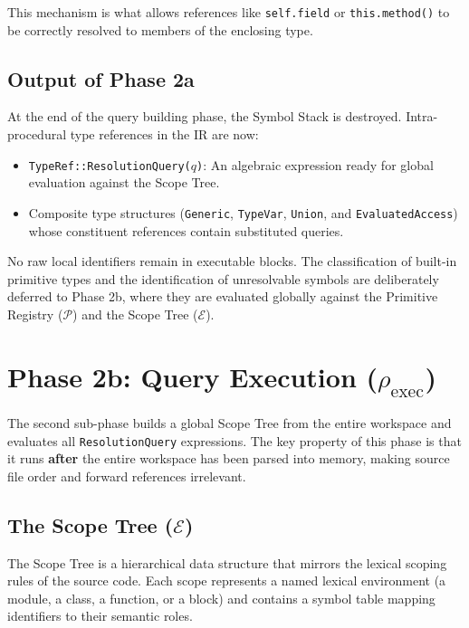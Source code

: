 This mechanism is what allows references like \texttt{self.field} or
\texttt{this.method()} to be correctly resolved to members of the
enclosing type.

\subsection{Output of Phase 2a}

At the end of the query building phase, the Symbol Stack is
destroyed. Intra-procedural type references in the IR are now:
\begin{itemize}
  \item \texttt{TypeRef::ResolutionQuery($q$)}: An algebraic
    expression ready for global evaluation against the Scope Tree.
  \item Composite type structures (\texttt{Generic}, \texttt{TypeVar},
      \texttt{Union}, and
    \texttt{Evaluated}\-\texttt{Ac}\-\texttt{cess}) whose constituent
    references contain substituted queries.
\end{itemize}

No raw local identifiers remain in executable blocks.
The classification of built-in primitive types and the identification of
unresolvable symbols are deliberately deferred to Phase 2b, where they are
evaluated globally against the Primitive Registry ($\mathcal{P}$) and the
Scope Tree ($\mathcal{E}$).

\section{Phase 2b: Query Execution ($\rho_{\text{exec}}$)}
\label{sec:query_execution}

The second sub-phase builds a global Scope Tree from the entire
workspace and evaluates all \texttt{ResolutionQuery} expressions. The
key property of this phase is that it runs \textbf{after} the entire
workspace has been parsed into memory, making source file order and
forward references irrelevant.

\subsection{The Scope Tree ($\mathcal{E}$)}
\label{sec:scope_tree}

The Scope Tree is a hierarchical data structure that mirrors the
lexical scoping rules of the source code. Each scope represents a
named lexical environment (a module, a class, a function, or a block)
and contains a symbol table mapping identifiers to their semantic roles.

